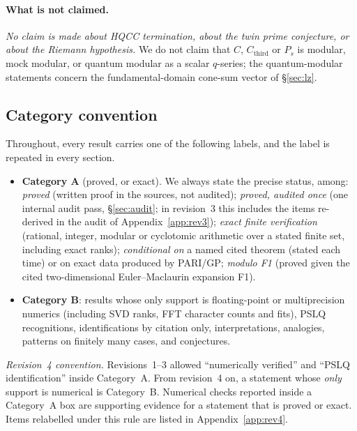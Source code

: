 \documentclass[11pt]{article}
\theoremstyle{definition}
\theoremstyle{plain}
\newcommand{\Cthird}{C_{\mathrm{third}}}
\begin{document}
\paragraph{What is not claimed.} \emph{No claim is made about HQCC termination, about the twin prime
conjecture, or about the Riemann hypothesis.} We do not claim that $C$, $\Cthird$ or $P_s$ is modular,
mock modular, or quantum modular as a scalar $q$-series; the quantum-modular statements concern the
fundamental-domain cone-sum vector of \S\ref{sec:lz}.

\subsection{Category convention}\label{sec:cat}
Throughout, every result carries one of the following labels, and the label is repeated in every section.
\begin{itemize}[leftmargin=2em]
\item \textbf{Category A} (proved, or exact). We always state the precise status, among:
\emph{proved} (written proof in the sources, not audited); \emph{proved, audited once} (one internal audit
pass, \S\ref{sec:audit}; in revision~3 this includes the items re-derived in the audit of Appendix~\ref{app:rev3}); \emph{exact finite verification}
(rational, integer, modular or cyclotomic arithmetic over a stated finite set, including exact ranks); \emph{conditional on} a named cited theorem
(stated each time) or on exact data produced by PARI/GP; \emph{modulo F1} (proved given the cited two-dimensional Euler--Maclaurin expansion F1).
\item \textbf{Category B}: results whose only support is floating-point or multiprecision numerics (including SVD ranks, FFT character counts and
fits), PSLQ recognitions, identifications by citation only, interpretations, analogies, patterns on finitely many cases, and conjectures.
\end{itemize}
\emph{Revision~4 convention.} Revisions~1--3 allowed ``numerically verified'' and ``PSLQ identification'' inside Category~A. From revision~4 on, a
statement whose \emph{only} support is numerical is Category~B. Numerical checks reported inside a Category~A box are supporting evidence for a
statement that is proved or exact. Items relabelled under this rule are listed in Appendix~\ref{app:rev4}.
\end{document}
